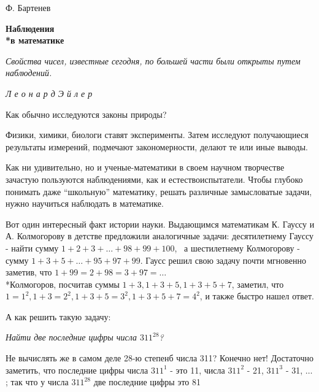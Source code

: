 \documentclass[main.tex]{subfiles}
\begin{document}
\begin{multicols}{2}
\begin{flushleft}Ф. Бартенев\end{flushleft}

\begin{flushleft}
\huge{\textbf{Наблюдения\\*в математике}} \par
\end{flushleft}

\begin{addmargin}[3em]{0em}
{\small \textit{Свойства чисел, известные сегодня, по большей части были открыты путем наблюдений.} \par}
\end{addmargin}

\begin{flushright}{\small \emph{Л е о н а р д  Э й л е р}\par}\end{flushright}

\noindent Как обычно исследуются законы природы?

Физики, химики, биологи ставят эксперименты.	Затем исследуют получающиеся результаты измерений, подмечают закономерности, делают те или иные выводы.

Как ни удивительно, но и ученые-математики в своем научном творчестве зачастую пользуются наблюдениями, как и естествоиспытатели. Чтобы глубоко понимать даже ``школьную'' математику, решать различные замысловатые задачи, нужно научиться наблюдать в математике.

Вот один интересный факт истории науки. Выдающимся математикам К. Гауссу и А. Колмогорову в детстве предложили аналогичные задачи: десятилетнему Гауссу - найти сумму $1 + 2 + 3 + \dots + 98 + 99 + 100$,  а шестилетнему Колмогорову - сумму $1 + 3 + 5 + \dots + 95 + 97 + 99$. Гаусс решил свою задачу почти мгновенно заметив, что $1 + 99 = 2 + 98 = 3 + 97 = \dots$\\*Колмогоров, посчитав суммы $1 + 3, 1 + 3 + 5, 1 + 3 + 5 + 7$, заметил, что $1 = 1^{2}, 1 + 3 = 2^{2}, 1 + 3 + 5 = 3^{2}, 1 + 3 + 5 + 7 = 4^{2}$, и также быстро нашел ответ.

А как решить такую задачу:

\textit{Найти две последние цифры числа $311^{28}$?}

Не вычислять же в самом деле 28-ю степенб числа 311? Конечно нет!  Достаточно заметить, что последние цифры числа $311^{1}$ - это 11, числа $311^{2}$ - 21, $311^{3}$ - 31, $\dots$; так что у числа $311^{28}$ две последние цифры это 81


\end{multicols}
\end{document}
